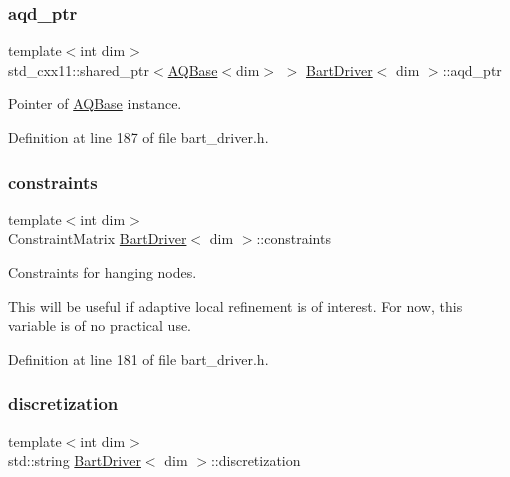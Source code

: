 \subsubsection{\texorpdfstring{aqd\+\_\+ptr}{aqd\_ptr}}
{\footnotesize\ttfamily template$<$int dim$>$ \\
std\+\_\+cxx11\+::shared\+\_\+ptr$<$\hyperlink{class_a_q_base}{A\+Q\+Base}$<$dim$>$ $>$ \hyperlink{class_bart_driver}{Bart\+Driver}$<$ dim $>$\+::aqd\+\_\+ptr\hspace{0.3cm}{\ttfamily [private]}}



Pointer of \hyperlink{class_a_q_base}{A\+Q\+Base} instance. 



Definition at line 187 of file bart\+\_\+driver.\+h.

\mbox{\label{class_bart_driver_a2414c8e66212bb95c86f1c70db4a4099}} 
\subsubsection{\texorpdfstring{constraints}{constraints}}
{\footnotesize\ttfamily template$<$int dim$>$ \\
Constraint\+Matrix \hyperlink{class_bart_driver}{Bart\+Driver}$<$ dim $>$\+::constraints\hspace{0.3cm}{\ttfamily [private]}}



Constraints for hanging nodes. 

This will be useful if adaptive local refinement is of interest. For now, this variable is of no practical use. 

Definition at line 181 of file bart\+\_\+driver.\+h.

\mbox{\label{class_bart_driver_a75cc884c6895beca3d3861ca226b4a3f}} 
\subsubsection{\texorpdfstring{discretization}{discretization}}
{\footnotesize\ttfamily template$<$int dim$>$ \\
std\+::string \hyperlink{class_bart_driver}{Bart\+Driver}$<$ dim $>$\+::discretization\hspace{0.3cm}{\ttfamily [private]}}



